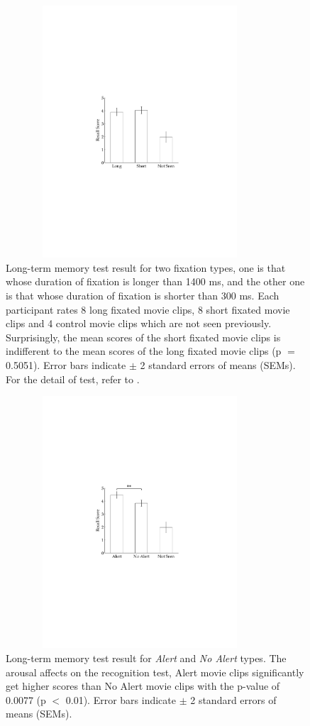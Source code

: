 \documentclass[oneside,master]{snueethesis}
\begin{document}
\begin{figure}
  \centerline{\includegraphics[width=100mm,height=94mm,trim=54mm 90mm 54mm 90mm]{./eps/memtest_leng}}
  \caption[Long-term memory test result for two fixation duration types]{Long-term memory test result for two fixation types, one is that whose duration of fixation is longer than 1400 ms, and the other one is that whose duration of fixation is shorter than 300 ms. Each participant rates 8 long fixated movie clips, 8 short fixated movie clips and 4 control movie clips which are not seen previously. Surprisingly, the mean scores of the short fixated movie clips is indifferent to the mean scores of the long fixated movie clips (p $=$ 0.5051). Error bars indicate $\pm$ 2 standard errors of means (SEMs). For the detail of test, refer to \textit{}.}
  \label{fig:memtest-leng}
\end{figure}

\begin{figure}
  \centerline{\includegraphics[width=100mm,height=94mm,trim=54mm 90mm 54mm 90mm]{./eps/memtest_alert}}
  \caption[Long-term memory test result for Alert and No Alert types]{Long-term memory test result for \textit{Alert} and \textit{No Alert} types. The arousal affects on the recognition test, Alert movie clips significantly get higher scores than No Alert movie clips with the p-value of 0.0077 (p $<$ 0.01). Error bars indicate $\pm$ 2 standard errors of means (SEMs).}
  \label{fig:memtest-alert}
\end{figure}
\end{document}
